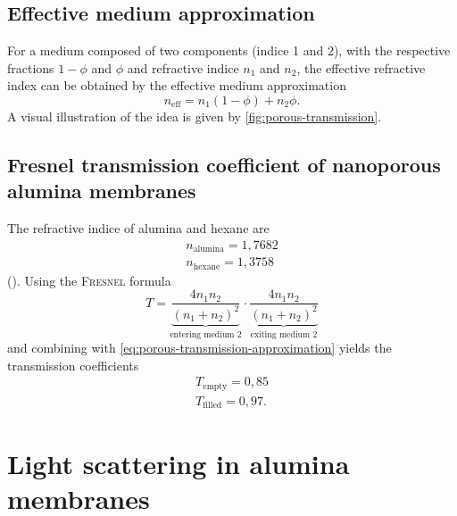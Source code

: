 \documentclass[../thesis.tex]{subfiles}
\begin{document}
      \subsection{Effective medium approximation}
      \label{subsec:effective-medium-approx}

        For a medium composed of two components (indice 1 and 2), with the respective fractions $1-\phi$ and $\phi$ and refractive indice $n_1$ and $n_2$, the effective refractive index can be obtained by the effective medium approximation
        \begin{equation}
          n_\mathrm{eff} = n_1 \left(1-\phi\right) + n_2 \phi.
          \label{eq:porous-transmission-approximation}
        \end{equation}
        A visual illustration of the idea is given by \cref{fig:porous-transmission}.

        


      \subsection{Fresnel transmission coefficient of nanoporous alumina membranes}

        The refractive indice of alumina and hexane are
        \begin{align*}
          n_\mathrm{alumina}=1,7682  \\%
          n_\mathrm{hexane}=1,3758  %
        \end{align*}
        (\cite{sapphire,hexane}). Using the \textsc{Fresnel} formula
        \begin{equation*}
          T=\underbrace{\frac{4n_1n_2}{\left( n_1+n_2\right) ^2}}_{\text{entering medium 2}}\cdot \underbrace{\frac{4n_1n_2}{\left( n_1+n_2\right)^2}}_{\text{exiting medium 2}}
        \end{equation*}
        and combining with \cref{eq:porous-transmission-approximation} yields the transmission coefficients
        \begin{align}
          T_\mathrm{empty}=0,85 \\
          T_\mathrm{filled}=0,97  .
          \label{eq:trans-coeffs}
        \end{align}


      \section{Light scattering in alumina membranes}
      \label{sec:scattering-in-alumina-membranes}
\end{document}
